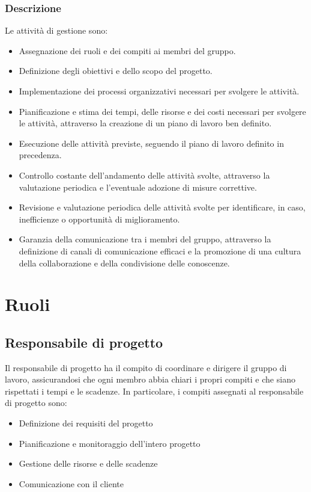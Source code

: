 \subsubsection{Descrizione}

Le attività di gestione sono:

\begin{itemize}
\item Assegnazione dei ruoli e dei compiti ai membri del gruppo.
\item Definizione degli obiettivi e dello scopo del progetto.
\item Implementazione dei processi organizzativi necessari per svolgere le attività.
\item Pianificazione e stima dei tempi, delle risorse e dei costi necessari per svolgere le attività, attraverso la creazione di un piano di lavoro ben definito.
\item Esecuzione delle attività previste, seguendo il piano di lavoro definito in precedenza.
\item Controllo costante dell'andamento delle attività svolte, attraverso la valutazione periodica e l'eventuale adozione di misure correttive.
\item Revisione e valutazione periodica delle attività svolte per identificare, in caso, inefficienze o opportunità di miglioramento.
\item Garanzia della comunicazione tra i membri del gruppo, attraverso la definizione di canali di comunicazione efficaci e la promozione di una cultura della collaborazione e della condivisione delle conoscenze.
\end{itemize}

\section{Ruoli}

\subsection{Responsabile di progetto}
Il responsabile di progetto ha il compito di coordinare e dirigere il gruppo di lavoro, assicurandosi che ogni membro abbia chiari i propri compiti e che siano rispettati i tempi e le scadenze. In particolare, i compiti assegnati al responsabile di progetto sono:

\begin{itemize}
\item Definizione dei requisiti del progetto
\item Pianificazione e monitoraggio dell'intero progetto
\item Gestione delle risorse e delle scadenze
\item Comunicazione con il cliente
\end{itemize}

